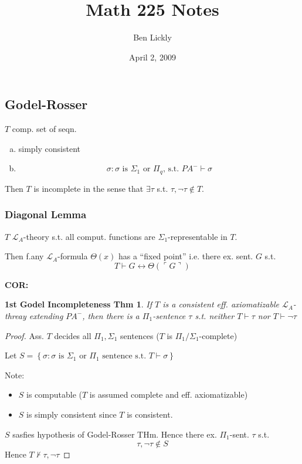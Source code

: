 \documentclass[12pt]{article}
\author{Ben Lickly}
\date{April 2, 2009}
\title{Math 225 Notes}
\newcommand{\proves}{\vdash}
\newcommand{\gn}[1]{\ulcorner #1 \urcorner}
\begin{document}
\maketitle

\subsection*{Godel-Rosser}
$T$ comp. set of seqn.
\begin{enumerate}[(a)]
  \item simply consistent
  \item \[
    \sigma : \sigma \text{ is $\Sigma_1$ or $\Pi_q$, s.t. } PA^- \proves \sigma
    \]
\end{enumerate}
Then $T$ is incomplete in the sense that $\exists\tau$ 
s.t. $\tau, \neg\tau \not\in T$.

\subsubsection*{Diagonal Lemma}
$T$ $\mathcal{L}_A$-theory s.t. all comput. functions are
$\Sigma_1$-representable in $T$.

Then f.any $\mathcal{L}_A$-formula  $\Theta(x)$ has a ``fixed point''
%
i.e. there ex. sent. $G$ s.t.
\[
T \proves G \leftrightarrow \Theta(\gn{G})
\]

\textbf{COR:}
\newtheorem*{firstincomp}{1st Godel Incompleteness Thm}
\begin{firstincomp}
  If $T$ is a consistent eff. axiomatizable $\mathcal{L}_A$-threay extending
  $PA^-$, then there is a $\Pi_1$-sentence $\tau$ s.t.
  neither $T \proves \tau$ nor $T \proves \neg\tau$
\end{firstincomp}
\begin{proof}
  Ass. $T$ decides all $\Pi_1,\Sigma_1$ sentences
               ($T$ is $\Pi_1/\Sigma_1$-complete)

  Let $S = \left\{ \sigma : \sigma \text{ is $\Sigma_1$ or $\Pi_1$ sentence s.t. } T \proves \sigma \right\}$

  Note:
  \begin{itemize}
    \item $S$ is computable ($T$ is assumed complete and eff. axiomatizable)
    \item $S$ is simply consistent since $T$ is consistent.
  \end{itemize}

  $S$ sasfies hypothesis of Godel-Rosser THm.
  Hence there ex. $\Pi_1$-sent. $\tau$ s.t.
  \[
        \tau, \neg\tau \not\in S
  \]
  Hence $T \not\proves \tau, \neg\tau$
\end{proof}
\end{document}
